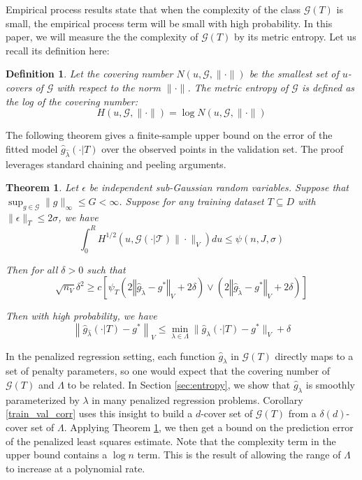 \documentclass[12pt]{article}
\newtheorem{theorem}{Theorem}
\newtheorem{definition}{Definition}
\begin{document}
Empirical process results state that when the complexity of the class $\mathcal{G}(T)$ is small, the empirical process term will be small with high probability. In this paper, we will measure the the complexity of $\mathcal{G}(T)$ by its metric entropy. Let us recall its definition here:

\begin{definition}
Let the covering number $N(u, \mathcal{G}, \| \cdot \|)$ be the smallest set of $u$-covers of $\mathcal{G}$ with respect to the norm $\| \cdot \|$. The metric entropy of $\mathcal{G}$ is defined as the log of the covering number:
\begin{equation}
H (u, \mathcal{G}, \| \cdot \| ) = \log N(u, \mathcal{G}, \| \cdot \|)
\end{equation}
\end{definition}

The following theorem gives a finite-sample upper bound on the error of the fitted model $\hat{g}_{\hat \lambda}(\cdot | T)$ over the observed points in the validation set. The proof leverages standard chaining and peeling arguments.

\begin{theorem}
\label{train_val_thrm}
Let $\epsilon$ be independent sub-Gaussian random variables. 
Suppose that $\sup_{g \in \mathcal{G}} \| g \|_\infty \le G < \infty$.
Suppose for any training dataset $T \subseteq D$ with $\| \epsilon \|_T \le 2 \sigma$, we have
\begin{equation}
\int_0^R H^{1/2} \left ( u, \mathcal{G(\cdot | T)} \| \cdot \|_V \right ) du \le \psi(n, J, \sigma)
\end{equation}

Then for all $\delta  > 0$ such that
\begin{equation}
\sqrt{n_{V}}\delta^{2}
\ge 
c \left[
\psi_{T}\left(2\left\Vert \hat{g}_{\tilde{\lambda}}-g^{*}\right\Vert _{V} + 2\delta\right)
\vee
\left(2\left\Vert \hat{g}_{\tilde{\lambda}}-g^{*}\right\Vert _{V}+2\delta\right)
\right]
\end{equation}

Then with high probability, we have
\begin{equation}
\label{error_bound}
\left \|\hat{g}_{\hat{\lambda} }(\cdot | T) - g^* \right \|_V
\le 
\min_{\lambda \in \Lambda}\| \hat{g}_{\lambda}(\cdot | T) - g^*\|_V
+ \delta
\end{equation}
\end{theorem}

In the penalized regression setting, each function $\hat{g}_\lambda$ in $\mathcal{G}(T)$ directly maps to a set of penalty parameters, so one would expect that the covering number of $\mathcal{G}(T)$ and $\Lambda$ to be related. In Section \ref{sec:entropy}, we show that $\hat{g}_\lambda$ is smoothly parameterized by $\lambda$ in many penalized regression problems. Corollary \ref{train_val_corr} uses this insight to build a $d$-cover set of $\mathcal{G}(T)$ from a $\delta(d)$-cover set of $\Lambda$. Applying Theorem \ref{train_val_thrm}, we then get a bound on the prediction error of the penalized least squares estimate. Note that the complexity term in the upper bound contains a $\log n$ term. This is the result of allowing the range of $\Lambda$ to increase at a polynomial rate.
\end{document}

